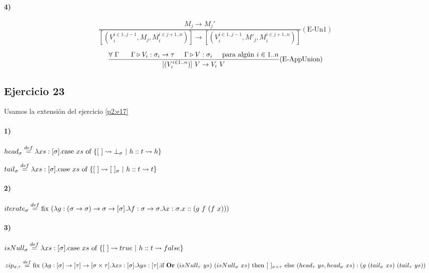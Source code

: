\documentclass[10pt,a4paper, landscape]{article}
\begin{document}
\paragraph{4)}
\begin{multicols}{2}
$$\frac{M_j\to M_j'}{[(V_i^{i\in 1..j-1}, M_j, M_i^{i\in j+1..n})]\to[(V_i^{i\in 1..j-1}, M'_j, M_i^{i\in j+1..n})]}(\text{E-Un1})$$

$$\frac{\forall~\Gamma~\hspace*{5mm}\Gamma\triangleright V_i : \sigma_i\to\tau\hspace*{5mm}\Gamma\triangleright V : \sigma_i\hspace*{5mm}\text{para algún }i\in 1..n}{[(V_i^{i\in 1..n})]~V\to V_i~V}(\text{E-AppUnion})$$
\end{multicols}

\newpage
\subsection{Ejercicio 23}
Usamos la extensión del ejercicio \ref{p2:e17}

\paragraph{1)}
\begin{multicols}{2}
$head_\sigma \overset{def}{=} \lambda xs: [\sigma] \text{.} \text{case } xs \text{ of } \{[~]\leadsto\bot_\sigma~|~h::t\leadsto h\}$ 

$tail_\sigma \overset{def}{=} \lambda xs: [\sigma] \text{.} \text{case } xs \text{ of } \{[~]\leadsto[~]_{\sigma}~|~h::t\leadsto t\}$
\end{multicols}

\paragraph{2)}
$iterate_\sigma\overset{def}{=} \text{fix } (\lambda g: (\sigma\to\sigma)\to\sigma\to[\sigma] \text{.} \lambda f: \sigma\to\sigma \text{.} \lambda x: \sigma \text{.} x::(g~f~(f~x)))$

\paragraph{3)} 

$isNull_\sigma \overset{def}{=} \lambda xs: [\sigma] \text{.} \text{case } xs \text{ of } \{[~]\leadsto true~|~h::t\leadsto false\}$

\vspace*{5mm}
$zip_{\sigma,\tau}\overset{def}{=} \text{fix } (\lambda g: [\sigma]\to[\tau]\to[\sigma\times\tau] \text{.} \lambda xs: [\sigma] \text{.} \lambda ys: [\tau] \text{.} \text{if } \textbf{Or}~(isNull_\tau~ys)~(isNull_\sigma~xs) \text{ then } [~]_{\sigma\times\tau} \text{ else } (head_\tau~ys,head_\sigma~xs):(g~(tail_\sigma~xs)~(tail_\tau~ys))$
\end{document}
